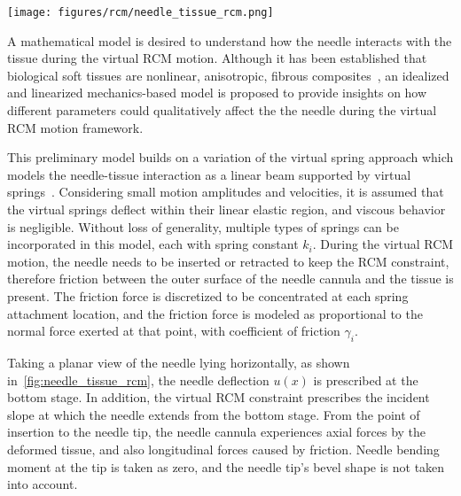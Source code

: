 \begin{figure*}[t]
  \centering
  \texttt{[image: figures/rcm/needle\_tissue\_rcm.png]}
  \caption{A planar view of virtual RCM motion of a needle inserted into an $N$-layer medium. The top and bottom stage displacements enforce the virtual RCM constraint ($m_2$ and $k_b$). The needle displaces the medium, generating an unknown reactive force distribution $F(x)$, which consists of normal force and friction force exerted by the medium. The mediums are modeled as a parallel arrangement of virtual springs, each with spring constants $k_i$ and friction coefficients $\gamma_i$. Along the inserted depth $l$, each spring is attached at end node of needle segment of length $l/n$. The reactive force deflects the needle to some shape $u(x)$, and causing the needle to intersect the $x$-axis at the instant center of motion (COM) where zero net displacement occurs.}
  \label{fig:needle_tissue_rcm}
\end{figure*}

A mathematical model is desired to understand how the needle interacts with the tissue during the virtual RCM motion. Although it has been established that biological soft tissues are nonlinear, anisotropic, fibrous composites~\parencite{petersonBiomechanicsPrinciplesApplications2007}, an idealized and linearized mechanics-based model is proposed to provide insights on how different parameters could qualitatively affect the the needle during the virtual RCM motion framework.

This preliminary model builds on a variation of the virtual spring approach which models the needle-tissue interaction as a linear beam supported by virtual springs~\parencite{glozmanImageGuidedRoboticFlexible2007,lehmannDeflectionModelingNeedle2017}. Considering small motion amplitudes and velocities, it is assumed that the virtual springs deflect within their linear elastic region, and viscous behavior is negligible. Without loss of generality, multiple types of springs can be incorporated in this model, each with spring constant $k_i$.
During the virtual RCM motion, the needle needs to be inserted or retracted to keep the RCM constraint, therefore friction between the outer surface of the needle cannula and the tissue is present. The friction force is discretized to be concentrated at each spring attachment location, and the friction force is modeled as proportional to the normal force exerted at that point, with coefficient of friction $\gamma_i$.

Taking a planar view of the needle lying horizontally, as shown in~\cref{fig:needle_tissue_rcm}, the needle deflection $u(x)$ is prescribed at the bottom stage. In addition, the virtual RCM constraint prescribes the incident slope at which the needle extends from the bottom stage. From the point of insertion to the needle tip, the needle cannula experiences axial forces by the deformed tissue, and also longitudinal forces caused by friction. Needle bending moment at the tip is taken as zero, and the needle tip's bevel shape is not taken into account.

